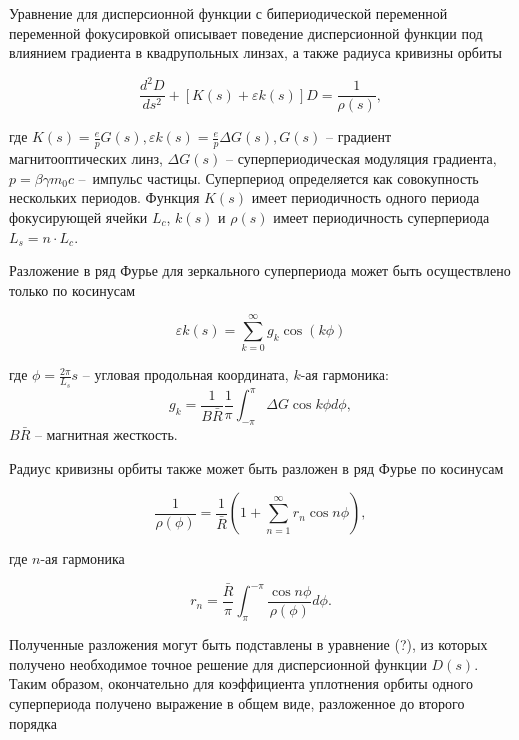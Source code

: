 \noindent Уравнение для дисперсионной функции с бипериодической переменной переменной фокусировкой описывает поведение дисперсионной функции под влиянием градиента в квадрупольных линзах, а также радиуса кривизны орбиты \cite{senichev:resonant}

\begin{equation}
\frac{d^2D}{ds^2}+\left[K(s)+\varepsilon k(s)\right]D=\frac{1}{\rho(s)} ,
\label{eq:disp_eq}
\end{equation}

\noindent где $K\left(s\right)=\frac{e}{p}G\left(s\right), \varepsilon k\left(s\right)=\frac{e}{p}\Delta G\left(s\right), G\left(s\right)$ – градиент магнитооптических линз, $\Delta G\left(s\right)$ – суперпериодическая модуляция градиента, $p=\beta\gamma m_0 c$ – импульс частицы. Суперпериод определяется как совокупность нескольких периодов. Функция $K\left(s\right)$ имеет периодичность одного периода фокусирующей ячейки $L_{c}$, $k(s)$ и $\rho(s)$ имеет периодичность суперпериода $L_s = n \cdot L_c$.

Разложение в ряд  Фурье для зеркального суперпериода может быть осуществлено только по косинусам

\begin{equation}
\varepsilon k\left(s\right)=\sum_{k=0}^{\infty}g_{k}\cos(k\phi)
\label{eq:superperiodicity_fourier}
\end{equation}

\noindent где $\phi=\frac{2\pi}{L_s}s$ -- угловая продольная координата, $k$-ая гармоника:
\begin{equation}
g_k=\frac{1}{B\bar{R}} \frac{1}{\pi} \int_{-\pi}^\pi \Delta G \cos k \phi d \phi,
\end{equation}
\noindent $B\bar{R}$ -- магнитная жесткость.

\noindent Радиус кривизны орбиты также может быть разложен в ряд Фурье по косинусам

\begin{equation}
\frac{1}{\rho(\phi)}=\frac{1}{\bar{R}}\left(1+\sum_{n=1}^{\infty} r_n \cos n \phi\right),
\end{equation}

\noindent где $n$-ая гармоника

\begin{equation}
r_n=\frac{\bar{R}}{\pi} \int_\pi^{-\pi} \frac{\cos n \phi}{\rho(\phi)} d \phi.
\end{equation}

\noindent Полученные разложения могут быть подставлены в уравнение (?), из которых получено необходимое точное решение для дисперсионной функции $D(s)$. Таким образом, окончательно для коэффициента уплотнения орбиты одного суперпериода получено выражение в общем виде, разложенное до второго порядка

